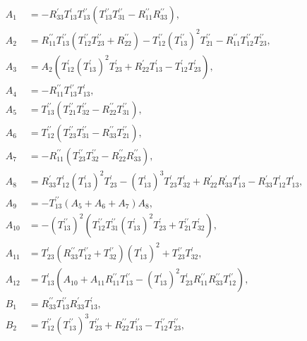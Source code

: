 \documentclass[a4 paper, 12 pt]{extarticle}
\begin{document}
   \[
   \begin{aligned}
   A_1 &= -R_{33}^\prime T_{13}^\prime T_{13}^{\prime\prime} \left(T_{13}^{\prime\prime} T_{31}^{\prime\prime} - R_{11}^{\prime\prime} R_{33}^{\prime\prime}\right), \\
   A_2 &= R_{11}^{\prime\prime} T_{13}^{\prime\prime} \left(T_{12}^{\prime\prime} T_{23}^{\prime\prime}  + R_{22}^{\prime\prime}\right) - T_{12}^{\prime\prime} (T_{13}^{\prime\prime})^2 T_{21}^{\prime\prime} - R_{11}^{\prime\prime} T_{12}^{\prime\prime} T_{23}^{\prime\prime}, \\
   A_3 &=  A_2 \left(T_{12}^\prime (T_{13}^\prime)^2 T_{23}^\prime + R_{22}^\prime T_{13}^\prime - T_{12}^\prime T_{23}^\prime\right),\\
   A_4 &= -R_{11}^{\prime\prime} T_{13}^{\prime\prime} T_{13}^\prime,\\
   A_5 &= T_{13}^{\prime\prime} \left(T_{21}^{\prime\prime} T_{32}^{\prime\prime} - R_{22}^{\prime\prime} T_{31}^{\prime\prime}\right),\\
   A_6 &= T_{12}^{\prime\prime} \left(T_{23}^{\prime\prime} T_{31}^{\prime\prime} - R_{33}^{\prime\prime} T_{21}^{\prime\prime}\right),\\
   A_7 &= -R_{11}^{\prime\prime} \left(T_{23}^{\prime\prime} T_{32}^{\prime\prime} - R_{22}^{\prime\prime} R_{33}^{\prime\prime}\right),\\
   A_8 &= R_{33}^\prime T_{12}^\prime (T_{13}^\prime)^2 T_{23}^\prime - (T_{13}^\prime)^3 T_{23}^\prime T_{32}^\prime + R_{22}^\prime R_{33}^\prime T_{13}^\prime - R_{33}^\prime T_{12}^\prime T_{13}^\prime,\\
   A_9 &= -T_{13}^{\prime\prime} \left(A_5 + A_6 + A_7\right) A_8,\\
   A_{10} &= -(T_{13}^{\prime\prime})^2 \left(T_{12}^{\prime\prime} T_{31}^{\prime\prime} (T_{13}^\prime)^2 T_{23}^\prime + T_{21}^{\prime\prime} T_{32}^\prime\right),\\
   A_{11} &= T_{23}^\prime \left(R_{33}^{\prime\prime} T_{12}^{\prime\prime} + T_{32}^{\prime\prime}\right) (T_{13}^\prime)^2 + T_{23}^{\prime\prime} T_{32}^\prime,\\
   A_{12} &= T_{13}^\prime \left(A_{10} + A_{11} R_{11}^{\prime\prime} T_{13}^{\prime\prime} - (T_{13}^\prime)^2 T_{23}^\prime R_{11}^{\prime\prime} R_{33}^{\prime\prime} T_{12}^{\prime\prime}\right),\\
   B_1 &= R_{33}^{\prime\prime} T_{13}^{\prime\prime} R_{33}^\prime T_{13}^\prime,\\
   B_2 &= T_{12}^{\prime\prime} (T_{13}^{\prime\prime})^3 T_{23}^{\prime\prime} + R_{22}^{\prime\prime} T_{13}^{\prime\prime} - T_{12}^{\prime\prime} T_{23}^{\prime\prime},\\

\end{aligned}\]
\end{document}
